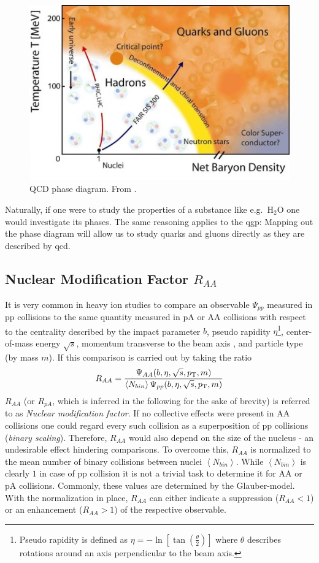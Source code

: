 \begin{figure}
  \centering
  \includegraphics[width=.6\textwidth]{figures/qcd-phase-diagram.png}
  \caption[QCD phase diagram.]{QCD phase diagram. From \cite{Scherer2004}.}
  \label{fig:qcd-phase-diagram}
\end{figure}

Naturally, if one were to study the properties of a substance like e.g.\ H$_2$O one would investigate its phases. The same reasoning applies to the \gls{qgp}: Mapping out the phase diagram will allow us to study quarks and gluons directly as they are described by \gls{qcd}.


\subsection{Nuclear Modification Factor $R_{AA}$}
\label{sec:nuc_mod_factor}

It is very common in heavy ion studies to compare an observable $\Psi_{pp}$ measured in  \gls{pp} collisions to the same quantity measured in \gls{pA} or \gls{AA} collisions with respect to the centrality described by the impact parameter $b$, pseudo rapidity $\eta$\footnote{Pseudo rapidity is defined as $\eta = -\ln\left[\tan\left(\frac{\theta}{2}\right)\right]$ where $\theta$ describes rotations around an axis perpendicular to the beam axis.}, center-of-mass energy $\sqrt{s}$, momentum transverse to the beam axis \pt, and particle type (by mass $m$). If this comparison is carried out by taking the ratio
\begin{equation}
  \label{eq:nuc_mod_factor}
  R_{AA} =
  \frac{\Psi_{AA}(b, \eta, \sqrt{s}, p_{\text{T}}, m)}
  {\left< N_{bin} \right>\Psi_{pp}(b, \eta, \sqrt{s}, p_{\text{T}}, m)}
\end{equation}
$R_{AA}$ (or $R_{pA}$, which is inferred in the following for the sake of brevity) is referred to as \emph{Nuclear modification factor}. If no collective effects were present in \gls{AA} collisions one could regard every such collision as a superposition of pp collisions (\emph{binary scaling}). Therefore, $R_{AA}$ would also depend on the size of the nucleus - an undesirable effect hindering comparisons. To overcome this, $R_{AA}$ is normalized to the mean number of binary collisions between nuclei $\left< N_{bin} \right>$. While $\left< N_{bin} \right>$ is clearly $1$ in case of pp collision it is not a trivial task to determine it for \gls{AA} or \gls{pA} collisions. Commonly, these values are determined by the Glauber-model. With the normalization in place, $R_{AA}$ can either indicate a suppression ($R_{AA} < 1$) or an enhancement ($R_{AA}> 1$) of the respective observable. 

